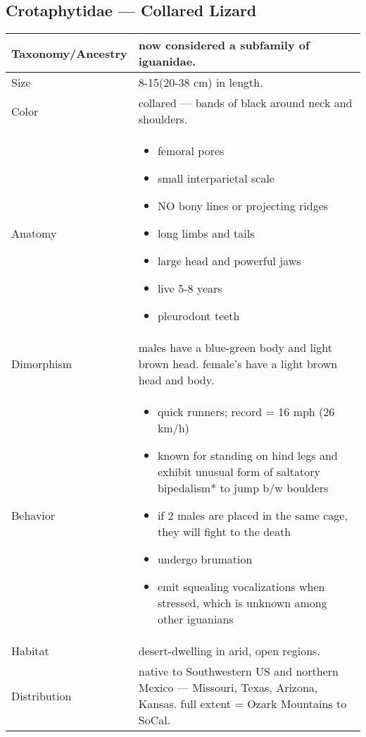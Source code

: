 \pagebreak
\subsection{Crotaphytidae --- Collared Lizard}
\begin{center}
\begin{longtabu} to 
	\hline
	Taxonomy/Ancestry &
	now considered a subfamily of iguanidae.
	 \\
	\hline
	Size & 
	8-15(20-38 cm) in length.
	\\
	\hline
	Color &
	collared --- bands of black around neck and shoulders. 
	 \\
	\hline
	Anatomy &
	\begin{itemize}[noitemsep]
		\item femoral pores
		\item small interparietal scale
		\item NO bony lines or projecting ridges
		\item long limbs and tails
		\item large head and powerful jaws
		\item live 5-8 years
		\item pleurodont teeth
	\end{itemize}	
	 \\
	\hline
	Dimorphism & 
	males have a blue-green body and light brown head. female's have a light brown head and body.
	\\
	\hline
	Behavior & 
	\begin{itemize}[noitemsep]
		\item quick runners; record = 16 mph (26 km/h)
		\item known for standing on hind legs and exhibit unusual form of saltatory bipedalism* to jump b/w boulders
		\item if 2 males are placed in the same cage, they will fight to the death
		\item undergo brumation
		\item emit squealing vocalizations when stressed, which is unknown among other iguanians
	\end{itemize}
	\\
	\hline
	Habitat & 
	desert-dwelling in arid, open regions.
	\\
	\hline
	Distribution & 
	native to Southwestern US and northern Mexico --- Missouri, Texas, Arizona, Kansas. full extent = Ozark Mountains to SoCal.
	\\

\end{longtabu}
\end{center}
